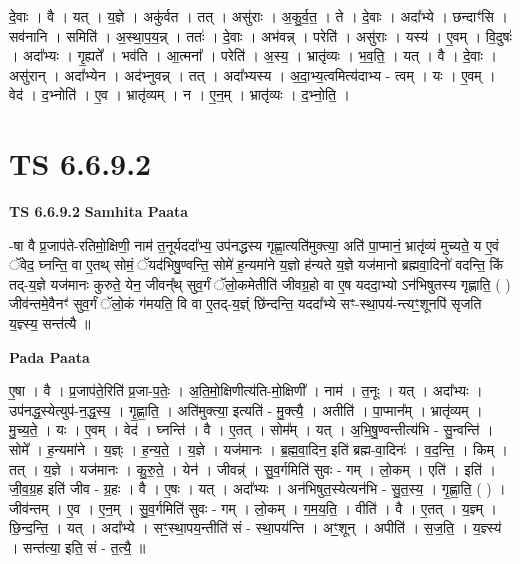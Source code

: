 \documentclass[17pt]{extarticle}
\begin{document}
दे॒वाः । वै । यत् । य॒ज्ञे । अकु॑र्वत । तत् । असु॑राः । अ॒कु॒र्व॒त॒ । ते । दे॒वाः । अदा᳚भ्ये । छन्दाꣳ॑सि । सव॑नानि । समिति॑ । अ॒स्था॒प॒य॒न्न् । ततः॑ । दे॒वाः । अभ॑वन्न् । परेति॑ । असु॑राः । यस्य॑ । ए॒वम् । वि॒दुषः॑ । अदा᳚भ्यः । गृ॒ह्यते᳚ । भव॑ति । आ॒त्मना᳚ । परेति॑ । अ॒स्य॒ । भ्रातृ॑व्यः । भ॒व॒ति॒ । यत् । वै । दे॒वाः । असु॑रान् । अदा᳚भ्येन । अद॑भ्नुवन्न् । तत् । अदा᳚भ्यस्य । अ॒दा॒भ्य॒त्वमित्य॑दाभ्य - त्वम् । यः । ए॒वम् । वेद॑ । द॒भ्नोति॑ । ए॒व । भ्रातृ॑व्यम् । न । ए॒न॒म् । भ्रातृ॑व्यः । द॒भ्नो॒ति॒ ।  \newline





\section{ TS 6.6.9.2 }

\textbf{TS 6.6.9.2 } \newline
\textbf{Samhita Paata} \newline

-षा वै प्र॒जाप॑ते-रतिमो॒क्षिणी॒ नाम॑ त॒नूर्यददा᳚भ्य॒ उप॑नद्धस्य गृह्णा॒त्यति॑मुक्त्या॒ अति॑ पा॒प्मानं॒ भ्रातृ॑व्यं मुच्यते॒ य ए॒वं ॅवेद॒ घ्नन्ति॒ वा ए॒तथ् सोमं॒ ॅयद॑भिषु॒ण्वन्ति॒ सोमे॑ ह॒न्यमा॑ने य॒ज्ञो ह॑न्यते य॒ज्ञे यज॑मानो ब्रह्मवा॒दिनो॑ वदन्ति॒ किं तद्-य॒ज्ञे यज॑मानः कुरुते॒ येन॒ जीवन्᳚थ् सुव॒र्गं ॅलो॒कमेतीति॑ जीवग्र॒हो वा ए॒ष यददा॒भ्यो ऽन॑भिषुतस्य गृह्णाति॒ ( ) जीव॑न्तमे॒वैनꣳ॑ सुव॒र्गं ॅलो॒कं ग॑मयति॒ वि वा ए॒तद्-य॒ज्ञ्ं छि॑न्दन्ति॒ यददा᳚भ्ये सꣳ-स्था॒पय॑-न्त्यꣳ॒॒शूनपि॑ सृजति य॒ज्ञ्स्य॒ सन्त॑त्यै ॥ \newline

\textbf{Pada Paata} \newline

ए॒षा । वै । प्र॒जाप॑ते॒रिति॑ प्र॒जा-प॒तेः॒ । अ॒ति॒मो॒क्षिणीत्य॑ति-मो॒क्षिणी᳚ । नाम॑ । त॒नूः । यत् । अदा᳚भ्यः । उप॑नद्ध॒स्येत्युप॑-न॒द्ध॒स्य॒ । गृ॒ह्णा॒ति॒ । अति॑मुक्त्या॒ इत्यति॑ - मु॒क्त्यै॒ । अतीति॑ । पा॒प्मान᳚म् । भ्रातृ॑व्यम् । मु॒च्य॒ते॒ । यः । ए॒वम् । वेद॑ । घ्नन्ति॑ । वै । ए॒तत् । सोम᳚म् । यत् । अ॒भि॒षु॒ण्वन्तीत्य॑भि - सु॒न्वन्ति॑ । सोमे᳚ । ह॒न्यमा॑ने । य॒ज्ञ्ः । ह॒न्य॒ते॒ । य॒ज्ञे । यज॑मानः । ब्र॒ह्म॒वा॒दिन॒ इति॑ ब्रह्म-वा॒दिनः॑ । व॒द॒न्ति॒ । किम् । तत् । य॒ज्ञे । यज॑मानः । कु॒रु॒ते॒ । येन॑ । जीवन्न्॑ । सु॒व॒र्गमिति॑ सुवः - गम् । लो॒कम् । एति॑ । इति॑ । जी॒व॒ग्र॒ह इति॑ जीव - ग्र॒हः । वै । ए॒षः । यत् । अदा᳚भ्यः । अन॑भिषुत॒स्येत्यन॑भि - सु॒त॒स्य॒ । गृ॒ह्णा॒ति॒ ( ) । जीव॑न्तम् । ए॒व । ए॒न॒म् । सु॒व॒र्गमिति॑ सुवः - गम् । लो॒कम् । ग॒म॒य॒ति॒ । वीति॑ । वै । ए॒तत् । य॒ज्ञ्म् । छि॒न्द॒न्ति॒ । यत् । अदा᳚भ्ये । सꣳ॒॒स्था॒पय॒न्तीति॑ सं - स्था॒पय॑न्ति । अꣳ॒॒शून् । अपीति॑ । स॒ज॒ति॒ । य॒ज्ञ्स्य॑ । सन्त॑त्या॒ इति॒ सं - त॒त्यै॒ ॥  \newline
\end{document}
